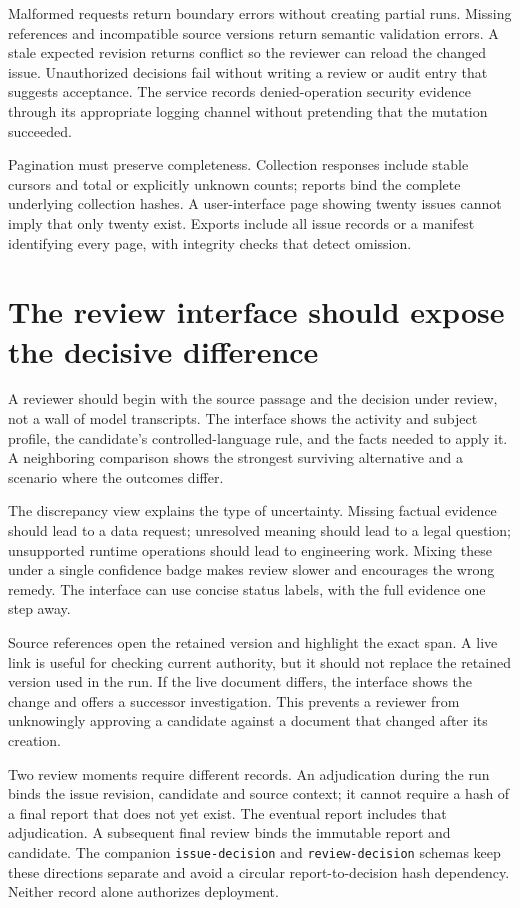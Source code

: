 \documentclass[12pt,a4paper,oneside,openany]{book}
\begin{document}
Malformed requests return boundary errors without creating partial runs. Missing
references and incompatible source versions return semantic validation errors.
A stale expected revision returns conflict so the reviewer can reload the changed
issue. Unauthorized decisions fail without writing a review or audit entry that
suggests acceptance. The service records denied-operation security evidence
through its appropriate logging channel without pretending that the mutation
succeeded.

Pagination must preserve completeness. Collection responses include stable cursors
and total or explicitly unknown counts; reports bind the complete underlying
collection hashes. A user-interface page showing twenty issues cannot imply that
only twenty exist. Exports include all issue records or a manifest identifying
every page, with integrity checks that detect omission.

\section{The review interface should expose the decisive difference}
\label{merge:M08:08}


A reviewer should begin with the source passage and the decision under review,
not a wall of model transcripts. The interface shows the activity and subject
profile, the candidate's controlled-language rule, and the facts needed to apply
it. A neighboring comparison shows the strongest surviving alternative and a
scenario where the outcomes differ.

The discrepancy view explains the type of uncertainty. Missing factual evidence
should lead to a data request; unresolved meaning should lead to a legal question;
unsupported runtime operations should lead to engineering work. Mixing these
under a single confidence badge makes review slower and encourages the wrong
remedy. The interface can use concise status labels, with the full evidence one
step away.

Source references open the retained version and highlight the exact span. A live
link is useful for checking current authority, but it should not replace the
retained version used in the run. If the live document differs, the interface
shows the change and offers a successor investigation. This prevents a reviewer
from unknowingly approving a candidate against a document that changed after
its creation.

Two review moments require different records. An adjudication during the run
binds the issue revision, candidate and source context; it cannot require a hash
of a final report that does not yet exist. The eventual report includes that
adjudication. A subsequent final review binds the immutable report and candidate.
The companion \texttt{issue-decision} and \texttt{review-decision} schemas keep
these directions separate and avoid a circular report-to-decision hash dependency.
Neither record alone authorizes deployment.
\end{document}
